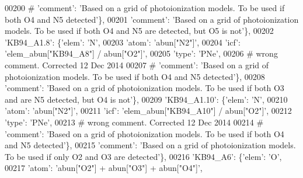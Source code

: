 \begin{DoxyCode}
00200 \textcolor{comment}{#                                      'comment': 'Based on a grid of photoionization models. To be used if
       both O4 and N5 detected'\},}
00201                                       \textcolor{stringliteral}{'comment'}: \textcolor{stringliteral}{'Based on a grid of photoionization models. To be used if
       both O4 and N5 are detected, but O5 is not'}\},
00202                          \textcolor{stringliteral}{'KB94\_A1.8'}: \{\textcolor{stringliteral}{'elem'}: \textcolor{stringliteral}{'N'},
00203                                      \textcolor{stringliteral}{'atom'}: \textcolor{stringliteral}{'abun["N2"]'},
00204                                      \textcolor{stringliteral}{'icf'}: \textcolor{stringliteral}{'elem\_abun["KB94\_A8"]  / abun["O2"]'},
00205                                      \textcolor{stringliteral}{'type'}: \textcolor{stringliteral}{'PNe'},
00206 \textcolor{comment}{# wrong comment. Corrected 12 Dec 2014}
00207 \textcolor{comment}{#                                     'comment': 'Based on a grid of photoionization models. To be used if
       both O4 and N5 detected'\},}
00208                                      \textcolor{stringliteral}{'comment'}: \textcolor{stringliteral}{'Based on a grid of photoionization models. To be used if
       both O3 and are N5 detected, but O4 is not'}\},
00209                          \textcolor{stringliteral}{'KB94\_A1.10'}: \{\textcolor{stringliteral}{'elem'}: \textcolor{stringliteral}{'N'},
00210                                      \textcolor{stringliteral}{'atom'}: \textcolor{stringliteral}{'abun["N2"]'},
00211                                      \textcolor{stringliteral}{'icf'}: \textcolor{stringliteral}{'elem\_abun["KB94\_A10"]  / abun["O2"]'},
00212                                      \textcolor{stringliteral}{'type'}: \textcolor{stringliteral}{'PNe'},
00213 \textcolor{comment}{# wrong comment. Corrected 12 Dec 2014}
00214 \textcolor{comment}{#                                      'comment': 'Based on a grid of photoionization models. To be used if
       both O4 and N5 detected'\},}
00215                                       \textcolor{stringliteral}{'comment'}: \textcolor{stringliteral}{'Based on a grid of photoionization models. To be used if
       only O2 and O3 are detected'}\},
00216                          \textcolor{stringliteral}{'KB94\_A6'}: \{\textcolor{stringliteral}{'elem'}: \textcolor{stringliteral}{'O'},
00217                                      \textcolor{stringliteral}{'atom'}: \textcolor{stringliteral}{'abun["O2"] + abun["O3"] + abun["O4"]'},

\end{DoxyCode}
